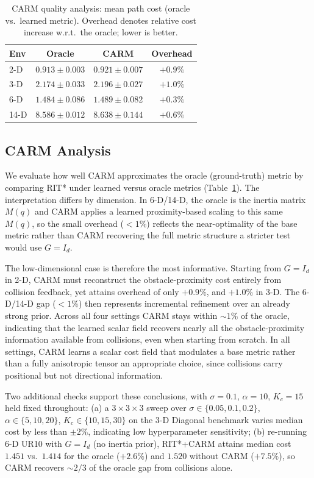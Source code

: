 \documentclass[journal]{IEEEtran}
\begin{document}
\begin{table}[t]
\centering
\caption{CARM quality analysis: mean path cost (oracle vs.\ learned metric). Overhead denotes relative cost increase w.r.t.\ the oracle; lower is better.}
\label{tab:carm}
\begin{tabular}{@{}l ccc@{}}
\toprule
\textbf{Env} & \textbf{Oracle} & \textbf{CARM} & \textbf{Overhead} \\
\midrule
2-D  & $0.913 \pm 0.003$ & $0.921 \pm 0.007$ & $+0.9\%$ \\
3-D  & $2.174 \pm 0.033$ & $2.196 \pm 0.027$ & $+1.0\%$ \\
6-D & $1.484 \pm 0.086$ & $1.489 \pm 0.082$ & $+0.3\%$ \\
14-D  & $8.586 \pm 0.012$ & $8.638 \pm 0.144$ & $+0.6\%$ \\
\bottomrule
\end{tabular}
\end{table}


\subsection{CARM Analysis}\label{sec:carm_analysis}

We evaluate how well CARM approximates the oracle (ground-truth) metric by comparing RIT* under learned versus oracle metrics (Table~\ref{tab:carm}). The interpretation differs by dimension. In 6-D/14-D, the oracle is the inertia matrix $M(q)$ and CARM applies a learned proximity-based scaling to this same $M(q)$, so the small overhead ($<\!1\%$) reflects the near-optimality of the base metric rather than CARM recovering the full metric structure a stricter test would use $G=I_d$.

The low-dimensional case is therefore the most informative. Starting from $G=I_d$ in 2-D, CARM must reconstruct the obstacle-proximity cost entirely from collision feedback, yet attains overhead of only $+0.9\%$, and $+1.0\%$ in 3-D. The 6-D/14-D gap ($<\!1\%$) then represents incremental refinement over an already strong prior. Across all four settings CARM stays within $\sim\!1\%$ of the oracle, indicating that the learned scalar field recovers nearly all the obstacle-proximity information available from collisions, even when starting from scratch. In all settings, CARM learns a scalar cost field that modulates a base metric rather than a fully anisotropic tensor an appropriate choice, since collisions carry positional but not directional information.

Two additional checks support these conclusions, with $\sigma\!=\!0.1$, $\alpha\!=\!10$, $K_c\!=\!15$ held fixed throughout: (a) a $3\!\times\!3\!\times\!3$ sweep over $\sigma\!\in\!\{0.05,0.1,0.2\}$, $\alpha\!\in\!\{5,10,20\}$, $K_c\!\in\!\{10,15,30\}$ on the 3-D Diagonal benchmark varies median cost by less than $\pm 2\%$, indicating low hyperparameter sensitivity; (b) re-running 6-D UR10 with $G\!=\!I_d$ (no inertia prior), RIT*+CARM attains median cost $1.451$ vs.\ $1.414$ for the oracle ($+2.6\%$) and $1.520$ without CARM ($+7.5\%$), so CARM recovers $\sim\!2/3$ of the oracle gap from collisions alone.
\end{document}
